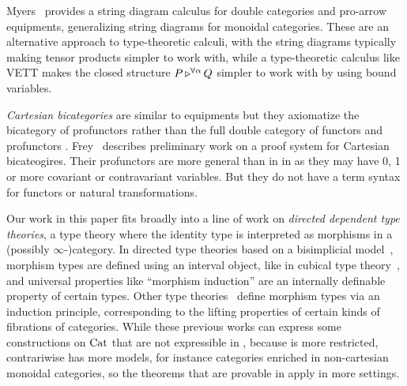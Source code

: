 \documentclass{llncs}
\begin{document}
Myers~\citet{jazmyers-strings} provides a string diagram calculus for
double categories and pro-arrow equipments, generalizing string
diagrams for monoidal categories. These are an
alternative approach to type-theoretic calculi, with the string
diagrams typically making tensor products simpler to work with, while
a type-theoretic calculus like VETT makes the closed structure
$P \mathop{\triangleright^{\forall \alpha}} Q$ simpler to work with by using bound
variables.

\emph{Cartesian bicategories} are similar to equipments but they
axiomatize the bicategory of profunctors rather than the full double
category of functors and profunctors \citet{CARBONI198711}.
Frey~\citet{frey} describes preliminary work on a proof system for
Cartesian bicateogires. Their profunctors are more general than in
\vett{} in as they may have 0, 1 or more covariant or contravariant
variables. But they do not have a term syntax for functors or natural
transformations.

Our work in this paper fits broadly into a line of work on
\emph{directed dependent type theories}, a type theory where the
identity type is interpreted as morphisms in a (possibly
$\infty$-)category.  In directed type theories based on a bisimplicial
model~\cite{riehlshulman17directed,buchholtzweinberger21fibered,weinberger22thesis,WeaverLicata20},
morphism types are defined using an interval object, like in cubical
type
theory~\cite{bch18,cchm18cubical,angiuli+18cartesian-csl,abcfhl17cartesian},
and universal properties like ``morphism induction'' are an internally
definable property of certain types.  Other type
theories~\cite{north18,ahrens+22semantics-2dtt} define morphism types
via an induction principle, corresponding to the lifting properties of
certain kinds of fibrations of categories.  While these previous works
can express some constructions on $\textrm{Cat}$ that are not expressible in
\vett{}, because \vett{} is more restricted, \vett{} contrariwise has
more models, for instance categories enriched in non-cartesian
monoidal categories, so the theorems that are provable in \vett{}
apply in more settings.

\end{document}
